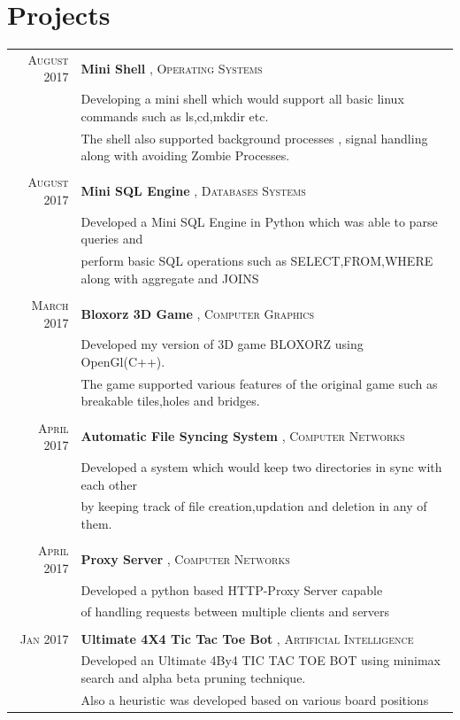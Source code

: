 \documentclass[a4paper,10pt]{article}
\begin{document}
\section{Projects}
\begin{tabular}{rl}	

\textsc{August} 2017 & \textbf{Mini Shell} , \textsc{Operating Systems}\\
& \footnotesize{Developing a mini shell which would support all basic linux commands such as ls,cd,mkdir etc.}\\
& \footnotesize{The shell also supported background processes , signal handling along with avoiding Zombie Processes.}\\\\




\textsc{August} 2017 & \textbf{Mini SQL Engine} , \textsc{Databases Systems}\\
& \footnotesize{Developed a Mini SQL Engine in Python which was able to parse queries and}\\
& \footnotesize{perform basic SQL operations such as SELECT,FROM,WHERE along with aggregate and JOINS}\\\\



\textsc{March} 2017 & \textbf{Bloxorz 3D Game} , \textsc{Computer Graphics}\\
& \footnotesize{Developed my version of 3D game BLOXORZ using OpenGl(C++).}\\
& \footnotesize{The game supported various features of the original game such as breakable tiles,holes and bridges.}\\\\

 \textsc{April} 2017 & \textbf{Automatic File Syncing System} , \textsc{Computer Networks}\\
& \footnotesize{Developed a system which would keep two directories in sync with each other}\\
& \footnotesize{by keeping track of file creation,updation and deletion in any of them.}\\\\


\textsc{April} 2017 & \textbf{Proxy Server} , \textsc{Computer Networks}\\
& \footnotesize{Developed a python based HTTP-Proxy Server capable}\\
& \footnotesize{ of handling requests between multiple clients and servers}\\\\


\textsc{Jan} 2017 & \textbf{Ultimate 4X4 Tic Tac Toe Bot} , \textsc{Artificial Intelligence}\\
& \footnotesize{Developed an Ultimate 4By4 TIC TAC TOE BOT using minimax search and alpha beta pruning technique.}\\
& \footnotesize{Also a heuristic was developed based on various board positions }\\



\end{tabular}
\end{document}
